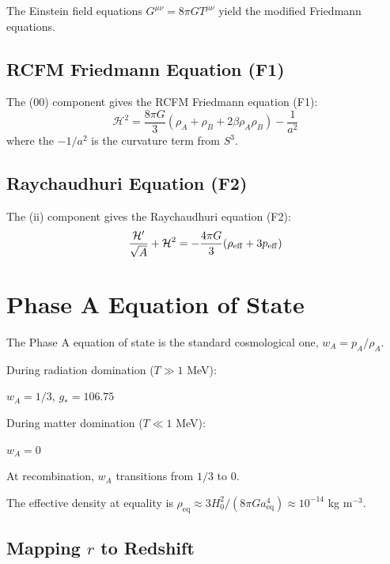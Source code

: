 \documentclass[10pt,twocolumn]{article}
\theoremstyle{definition}
\newcommand{\rhoA}{\rho_{A}}
\newcommand{\rhoB}{\rho_{B}}
\newcommand{\Hcal}{\mathcal{H}}
\begin{document}
The Einstein field equations \( G^{\mu\nu} = 8 \pi G T^{\mu\nu} \) yield the modified Friedmann equations.



\subsection{RCFM Friedmann Equation (F1)}

The (00) component gives the RCFM Friedmann equation (F1):
\begin{equation}
  \Hcal^{2} = \frac{8 \pi G}{3} (\rhoA + \rhoB + 2 \beta \rhoA \rhoB) - \frac{1}{a^{2}}
  \label{eq:F1}
\end{equation}
where the \( -1/a^{2} \) is the curvature term from \( S^{3} \).



\subsection{Raychaudhuri Equation (F2)}

The (ii) component gives the Raychaudhuri equation (F2):
\begin{equation}
  \frac{\Hcal'}{\sqrt{A}} + \Hcal^2 = -\frac{4\pi G}{3}(\rho_{\rm eff} + 3p_{\rm eff})
  \label{eq:F2}
\end{equation}



\section{Phase A Equation of State}
\label{sec:eos}

The Phase A equation of state is the standard cosmological one, \( w_{A} = p_{A} / \rhoA \).

During radiation domination (\( T \gg 1 \) MeV):

\( w_{A} = 1/3 \), \( g_{*} = 106.75 \)

During matter domination (\( T \ll 1 \) MeV):

\( w_{A} = 0 \)

At recombination, \( w_{A} \) transitions from $1/3$ to $0$.

The effective density at equality is \( \rho_{\mathrm{eq}} \approx 3 H_{0}^{2} / (8 \pi G a_{\mathrm{eq}}^{4}) \approx 10^{-14} \) kg m\( ^{-3} \).

\subsection{Mapping \( r \) to Redshift}
\end{document}
